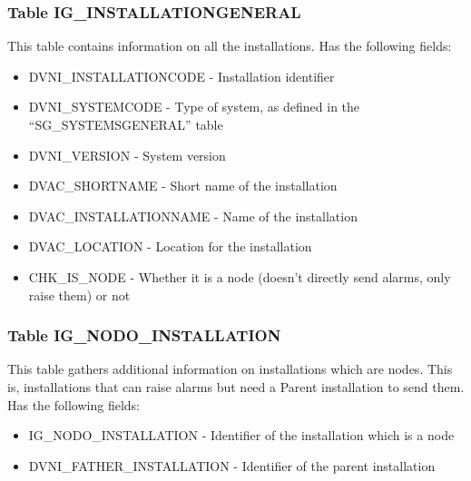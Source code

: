 \documentclass[a4paper,10pt]{article}
\begin{document}
\subsubsection*{Table IG\_INSTALLATIONGENERAL}
This table contains information on all the installations. Has the following fields:
\begin{itemize}
 \item DVNI\_INSTALLATIONCODE - Installation identifier
 \item DVNI\_SYSTEMCODE - Type of system, as defined in the ``SG\_SYSTEMSGENERAL'' table
 \item DVNI\_VERSION - System version
 \item DVAC\_SHORTNAME - Short name of the installation
 \item DVAC\_INSTALLATIONNAME - Name of the installation
 \item DVAC\_LOCATION - Location for the installation
 \item CHK\_IS\_NODE - Whether it is a node (doesn't directly send alarms, only raise them) or not
\end{itemize}

\subsubsection*{Table IG\_NODO\_INSTALLATION}
This table gathers additional information on installations which are nodes. This is, installations that can raise alarms but need a Parent installation to send them. Has the following fields:
\begin{itemize}
 \item IG\_NODO\_INSTALLATION - Identifier of the installation which is a node
 \item DVNI\_FATHER\_INSTALLATION - Identifier of the parent installation
\end{itemize}
\end{document}
